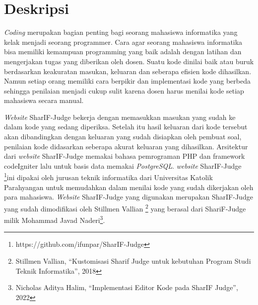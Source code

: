 \documentclass[a4paper,twoside]{article}
\begin{document}
	
	\title{\@judultopik}
	\author{\nama \textendash \@npm} 
	
	\newcommand{\nama}{Christofer Setiawan}
	\newcommand{\@npm}{6182301076}
	\newcommand{\@judultopik}{Pengembangan Fitur Ujian dan Download Assignment Pada SharIF-Judge} %
	\newcommand{\jumpemb}{1} %
	\newcommand{\tanggal}{17/09/2026}
	
	
	\maketitle
	
	
	\section{Deskripsi}
	\textit{Coding} merupakan bagian penting bagi seorang mahasiswa informatika yang kelak menjadi seorang programmer. Cara agar seorang mahasiswa informatika bisa memiliki kemampuan programming yang baik adalah dengan latihan dan mengerjakan tugas yang diberikan oleh dosen. Suatu kode dinilai baik atau buruk berdasarkan keakuratan masukan, keluaran dan seberapa efisien kode dihasilkan. Namun setiap orang memiliki cara berpikir dan implementasi kode yang berbeda sehingga penilaian menjadi cukup sulit karena dosen harus menilai kode setiap mahasiswa secara manual.
    
    \textit{Website} SharIF-Judge bekerja dengan memasukkan masukan yang sudah ke dalam kode yang sedang diperiksa. Setelah itu hasil keluaran dari kode tersebut akan dibandingkan dengan keluaran yang sudah disiapkan oleh pembuat soal, penilaian kode didasarkan seberapa akurat keluaran yang dihasilkan. Arsitektur dari \textit{website} SharIF-Judge memakai bahasa pemrograman PHP dan framework codeIgniter lalu untuk basis data memakai \textit{PostgreSQL}. \textit{website} SharIF-Judge  \footnote{https://github.com/ifunpar/SharIF-Judge}ini dipakai oleh jurusan teknik informatika dari Universitas Katolik Parahyangan untuk memudahkan dalam menilai kode yang sudah dikerjakan oleh para mahasiswa. \textit{Website} SharIF-Judge yang digunakan merupakan SharIF-Judge yang sudah dimodifikasi oleh Stillmen Vallian \footnote{Stillmen Vallian, “Kustomisasi Sharif Judge untuk kebutuhan Program Studi Teknik Informatika”, 2018} yang berasal dari ShariF-Judge milik Mohammad Javad Naderi\footnote{Nicholas Aditya Halim, “Implementasi Editor Kode pada SharIF Judge”, 2022}.
\end{document}
